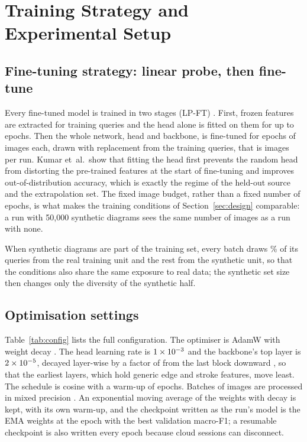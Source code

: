 \section{Training Strategy and Experimental Setup}
\label{sec:training}

\subsection{Fine-tuning strategy: linear probe, then fine-tune}

Every fine-tuned model is trained in two stages (LP-FT) \cite{kumar2022lpft}. First, frozen features are extracted for \ftLPQueries{} training queries and the head alone is fitted on them for up to \ftLPEpochs{} epochs. Then the whole network, head and backbone, is fine-tuned for \ftEpochs{} epochs of \ftEpochImages{} images each, drawn with replacement from the training queries, that is \ftTotalImages{} images per run. Kumar et~al.\ show that fitting the head first prevents the random head from distorting the pre-trained features at the start of fine-tuning and improves out-of-distribution accuracy, which is exactly the regime of the held-out source and the extrapolation set. The fixed image budget, rather than a fixed number of epochs, is what makes the training conditions of Section~\ref{sec:design} comparable: a run with 50,000 synthetic diagrams sees the same number of images as a run with none.

When synthetic diagrams are part of the training set, every batch draws \ftRealFractionPct\% of its queries from the real training unit and the rest from the synthetic unit, so that the conditions also share the same exposure to real data; the synthetic set size then changes only the diversity of the synthetic half.

\subsection{Optimisation settings}

Table~\ref{tab:config} lists the full configuration. The optimiser is AdamW \cite{loshchilov2019adamw} with weight decay \ftWeightDecay. The head learning rate is $1\times 10^{-3}$ and the backbone's top layer is $2\times 10^{-5}$, decayed layer-wise by a factor of \ftLLRD{} from the last block downward \cite{howard2018ulmfit}, so that the earliest layers, which hold generic edge and stroke features, move least. The schedule is cosine \cite{loshchilov2017sgdr} with a warm-up of \ftWarmupEpochs{} epochs. Batches of \ftBatch{} images are processed in \ftAmpDtype{} mixed precision \cite{micikevicius2018amp}. An exponential moving average of the weights with decay \ftEMA{} \cite{polyak1992averaging} is kept, with its own warm-up, and the checkpoint written as the run's model is the EMA weights at the epoch with the best validation macro-F1; a resumable checkpoint is also written every epoch because cloud sessions can disconnect.

